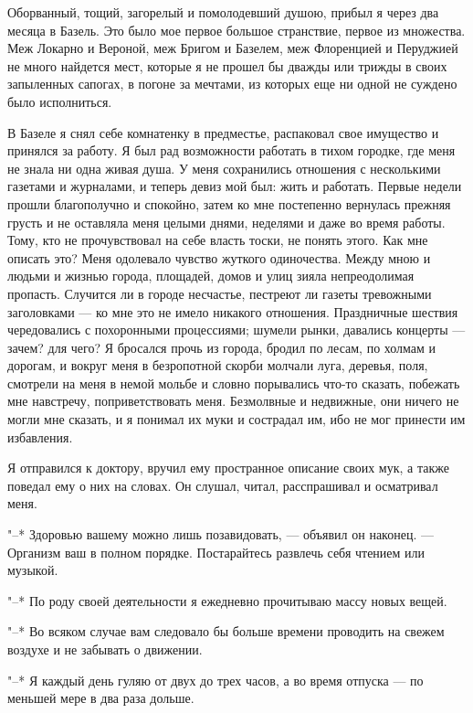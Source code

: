 Оборванный, тощий, загорелый и помолодевший  душою, прибыл я через два
месяца в  Базель. Это  было мое первое  большое странствие,  первое из
множества. Меж Локарно и Вероной, меж Бригом и Базелем, меж Флоренцией
и Перуджией не много найдется мест,  которые я не прошел бы дважды или
трижды в своих запыленных сапогах, в погоне за мечтами, из которых еще
ни одной не суждено было исполниться.

В  Базеле  я  снял  себе  комнатенку  в  предместье,  распаковал  свое
имущество  и принялся  за работу.  Я  был рад  возможности работать  в
тихом  городке,  где  меня  не  знала  ни  одна  живая  душа.  У  меня
сохранились  отношения с  несколькими газетами  и журналами,  и теперь
девиз мой  был: жить и  работать. Первые недели прошли  благополучно и
спокойно,  затем  ко мне  постепенно  вернулась  прежняя грусть  и  не
оставляла  меня  целыми  днями,  неделями  и  даже  во  время  работы.
Тому,  кто не  прочувствовал на  себе власть  тоски, не  понять этого.
Как  мне  описать это?  Меня  одолевало  чувство жуткого  одиночества.
Между мною  и людьми  и жизнью  города, площадей,  домов и  улиц зияла
непреодолимая пропасть.  Случится ли  в городе несчастье,  пестреют ли
газеты  тревожными  заголовками  ---  ко мне  это  не  имело  никакого
отношения. Праздничные шествия чередовались с похоронными процессиями;
шумели рынки, давались концерты ---  зачем? для чего? Я бросался прочь
из  города, бродил  по лесам,  по холмам  и дорогам,  и вокруг  меня в
безропотной  скорби  молчали луга,  деревья,  поля,  смотрели на  меня
в  немой  мольбе и  словно  порывались  что-то сказать,  побежать  мне
навстречу, поприветствовать  меня. Безмолвные и недвижные,  они ничего
не могли мне сказать,  и я понимал их муки и сострадал  им, ибо не мог
принести им избавления.

Я отправился к  доктору, вручил ему пространное описание  своих мук, а
также поведал  ему о них на  словах. Он слушал, читал,  расспрашивал и
осматривал меня.

"--* Здоровью вашему можно лишь  позавидовать, --- объявил он наконец.
--- Организм ваш в полном  порядке. Постарайтесь развлечь себя чтением
или музыкой.

"--* По  роду своей  деятельности я  ежедневно прочитываю  массу новых
вещей.

"--* Во  всяком случае  вам следовало бы  больше времени  проводить на
свежем воздухе и не забывать о движении.

"--* Я каждый день гуляю от двух до трех часов, а во время отпуска ---
по меньшей мере в два раза дольше.

